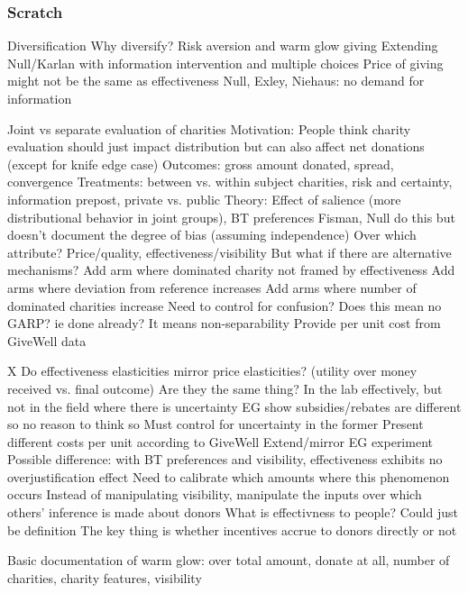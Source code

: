 \documentclass[aspectratio=169]{beamer}
\begin{document}
\begin{frame}[fragile] \frametitle{Scratch}

    Diversification
        Why diversify? Risk aversion and warm glow giving
        Extending Null/Karlan with information intervention and multiple choices
        Price of giving might not be the same as effectiveness
        Null, Exley, Niehaus: no demand for information

    Joint vs separate evaluation of charities
        Motivation: People think charity evaluation should just impact distribution but can also affect net donations (except for knife edge case)
        Outcomes: gross amount donated, spread, convergence
        Treatments: between vs. within subject charities, risk and certainty, information prepost, private vs. public
        Theory: Effect of salience (more distributional behavior in joint groups), BT preferences
        Fisman, Null do this but doesn't document the degree of bias (assuming independence)
        Over which attribute? Price/quality, effectiveness/visibility
        But what if there are alternative mechanisms?
        Add arm where dominated charity not framed by effectiveness
        Add arms where deviation from reference increases
        Add arms where number of dominated charities increase
        Need to control for confusion?
        Does this mean no GARP? ie done already? It means non-separability
        Provide per unit cost from GiveWell data

    X Do effectiveness elasticities mirror price elasticities? (utility over money received vs. final outcome)
        Are they the same thing?
        In the lab effectively, but not in the field where there is uncertainty
        EG show subsidies/rebates are different so no reason to think so
        Must control for uncertainty in the former
        Present different costs per unit according to GiveWell
        Extend/mirror EG experiment
        Possible difference: with BT preferences and visibility, effectiveness exhibits no overjustification effect
        Need to calibrate which amounts where this phenomenon occurs
        Instead of manipulating visibility, manipulate the inputs over which others' inference is made about donors
        What is effectivness to people? Could just be definition
        The key thing is whether incentives accrue to donors directly or not

    Basic documentation of warm glow: over total amount, donate at all, number of charities, charity features, visibility


\end{frame}
\end{document}

